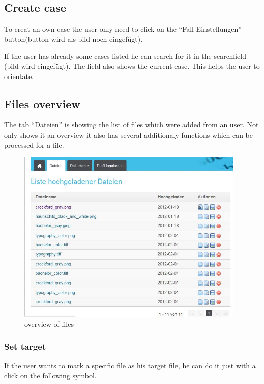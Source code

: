 \subsection{Create case}

To creat an own case the user only need to click on the \enquote{Fall Einstellungen} button(button wird als bild noch eingefügt).

If the user has already some cases listed he can search for it in the searchfield (bild wird eingefügt). The field also shows the current case. This helps the user to orientate.

\subsection{Files overview}

The tab \enquote{Dateien} is showing the list of files which were added from an user. Not only shows it an overview it 
also has several additionaly functions which can be processed for a file.

\begin{figure}[!ht]
  \centering
    \includegraphics[width=0.97\textwidth]{images/basic_functionalities/dateien.jpg}
  \caption{overview of files}
  \label{fig:einloggen}
\end{figure}

\subsubsection{Set target}

If the user wants to mark a specific file as his target file, he can do it just with a click on the following symbol.

